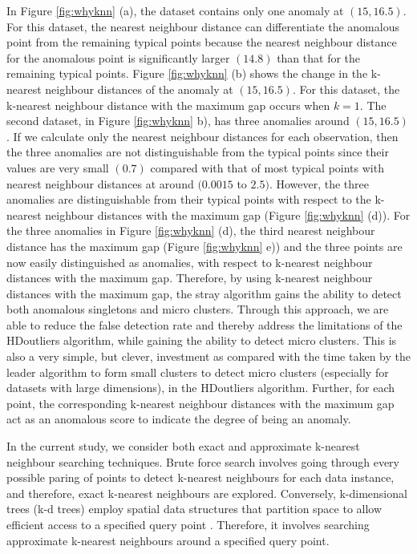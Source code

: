 \documentclass[11pt,a4paper,]{article}
\theoremstyle{definition}
\theoremstyle{definition}
\theoremstyle{definition}
\theoremstyle{remark}
\begin{document}
In Figure \ref{fig:whyknn} (a), the dataset contains only one anomaly at \((15,16.5)\). For this dataset, the nearest neighbour distance can differentiate the anomalous point from the remaining typical points because the nearest neighbour distance for the anomalous point is significantly larger \((14.8)\) than that for the remaining typical points. Figure \ref{fig:whyknn} (b) shows the change in the k-nearest neighbour distances of the anomaly at \((15,16.5)\). For this dataset, the k-nearest neighbour distance with the maximum gap occurs when \(k=1\). The second dataset, in Figure \ref{fig:whyknn} b), has three anomalies around \((15,16.5)\). If we calculate only the nearest neighbour distances for each observation, then the three anomalies are not distinguishable from the typical points since their values are very small \((0.7)\) compared with that of most typical points with nearest neighbour distances at around \((0.0015\) to \(2.5)\). However, the three anomalies are distinguishable from their typical points with respect to the k-nearest neighbour distances with the maximum gap (Figure \ref{fig:whyknn} (d)). For the three anomalies in Figure \ref{fig:whyknn} (d), the third nearest neighbour distance has the maximum gap (Figure \ref{fig:whyknn} e)) and the three points are now easily distinguished as anomalies, with respect to k-nearest neighbour distances with the maximum gap. Therefore, by using k-nearest neighbour distances with the maximum gap, the stray algorithm gains the ability to detect both anomalous singletons and micro clusters. Through this approach, we are able to reduce the false detection rate and thereby address the limitations of the HDoutliers algorithm, while gaining the ability to detect micro clusters. This is also a very simple, but clever, investment as compared with the time taken by the leader algorithm to form small clusters to detect micro clusters (especially for datasets with large dimensions), in the HDoutliers algorithm. Further, for each point, the corresponding k-nearest neighbour distances with the maximum gap act as an anomalous score to indicate the degree of being an anomaly.

In the current study, we consider both exact and approximate k-nearest neighbour searching techniques. Brute force search involves going through every possible paring of points to detect k-nearest neighbours for each data instance, and therefore, exact k-nearest neighbours are explored. Conversely, k-dimensional trees (k-d trees) employ spatial data structures that partition space to allow efficient access to a specified query point \autocite{elseberg2012comparison}. Therefore, it involves searching approximate k-nearest neighbours around a specified query point.
\end{document}
